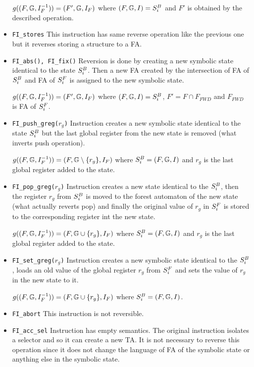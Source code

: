 \begin{itemize}
		$g((F, \mathbb{G}, I_{F}^{-1})) = (F', \mathbb{G}, I_{F})$
			where $(F, \mathbb{G}, I) = S^{B}_{i}$ and $F'$ is obtained
			by the described operation.

	
	\item {\tt FI\_stores}
		This instruction has same reverse operation like the previous one but
		it reverses storing a structure to a FA.

	\item {\tt FI\_abs(), FI\_fix()}
		Reversion is done by creating a new symbolic state identical to the state $S^{B}_{i}$.
		Then a new FA created by the intersection of FA of $S^{B}_{i}$ and FA of $S^{F}_{i}$ is assigned
		to the new symbolic state.

		$g((F, \mathbb{G}, I_{F}^{-1})) = (F', \mathbb{G}, I_{F})$
			where $(F, \mathbb{G}, I) = S^{B}_{i}$, $F' = F \cap F_{FWD}$ and $F_{FWD}$ is
			FA of $S^{F}_{i}$.

	\item {\tt FI\_push\_greg($r_g$)}
		Instruction creates a new symbolic state identical to the state $S^{B}_{i}$ but
		the last global register from the new state is removed (what inverts push operation).

		$g((F, \mathbb{G}, I_{F}^{-1})) = (F, \mathbb{G} \setminus \{r_g\}, I_{F})$ where $S^{B}_{i} = (F, \mathbb{G}, I)$ and $r_g$
		is the last global register added to the state.

	\item {\tt FI\_pop\_greg($r_g$)}
		Instruction creates a new state identical to the $S^{B}_{i}$,
		then the register $r_g$ from $S^{B}_{i}$ is moved to the
		forest automaton of the new state (what actually reverts pop)
		and finally the original value of $r_g$ in $S^{F}_{i}$ is stored
		to the corresponding register int the new state.
	
		$g((F, \mathbb{G}, I_{F}^{-1})) = (F, \mathbb{G} \cup \{r_g\}, I_{F})$ where $S^{B}_{i} = (F, \mathbb{G}, I)$ and $r_g$
		is the last global register added to the state.
	
	\item {\tt FI\_set\_greg($r_g$)}
		Instruction creates a new symbolic state identical to the $S^{B}_{i}$,
		loads an old value of the global register $r_g$ from $S^{F}_{i}$
		and sets the value of $r_g$ in the new state to it.

		$g((F, \mathbb{G}, I_{F}^{-1})) = (F, \mathbb{G} \cup \{r_g\}, I_{F})$ where $S^{B}_{i} = (F, \mathbb{G}, I)$.

	\item {\tt FI\_abort}
		This instruction is not reversible.

	\item {\tt FI\_acc\_sel}
		Instruction has empty semantics.
		The original instruction isolates a selector
		and so it can create a new TA.
		It is not necessary to reverse this operation
		since it does not change the language of FA of the
		symbolic state or anything else in the symbolic state.
		

\end{itemize}
